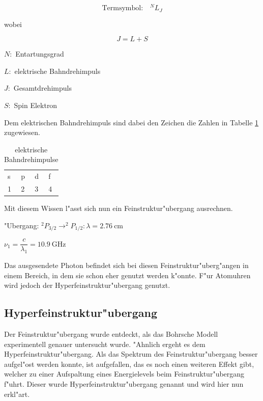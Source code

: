 \begin{refsection}
\begin{equation}
	\text{Termsymbol:} \quad ^NL _J
\end{equation}

wobei

\begin{equation}
	J = L + S
\end{equation}

$N:$ Entartungsgrad

$L:$ elektrische Bahndrehimpuls

$J:$ Gesamtdrehimpuls

$S:$ Spin Elektron

Dem elektrischen Bahndrehimpuls sind dabei den Zeichen die Zahlen in
Tabelle \ref{atomuhr:drehimpulsnotation} zugewiesen.

\begin{table}
	\centering	
	\begin{tabular}{llll}
		s & p & d & f \\
		1 & 2 & 3 & 4 \\
	\end{tabular}
	\caption{elektrische Bahndrehimpulse}
	\label{atomuhr:drehimpulsnotation}
\end{table}

Mit diesem Wissen l"asst sich nun ein Feinstruktur"ubergang ausrechnen. 
\begin{center}
		"Ubergang: $^2P_{3/2} \rightarrow ^2P_{1/2}: \lambda = \SI{2.76}{\centi\meter}$
		
		$\nu_1 = \dfrac{c}{\lambda_1} = \SI{10.9}{\giga\hertz}$
\end{center}

Das ausgesendete Photon befindet sich bei diesen
Feinstruktur"uberg"angen in einem Bereich, in dem sie schon eher
genutzt werden k"onnte. F"ur Atomuhren wird jedoch der
Hyperfeinstruktur"ubergang genutzt.

\subsection{Hyperfeinstruktur"ubergang}
\label{sec:hyperf}
Der Feinstruktur"ubergang wurde entdeckt, als das Bohrsche Modell
experimentell genauer untersucht wurde. "Ahnlich ergeht es dem
Hyperfeinstruktur"ubergang. Als das Spektrum des Feinstruktur"ubergang
besser aufgel"ost werden konnte, ist aufgefallen, das es noch einen
weiteren Effekt gibt, welcher zu einer Aufspaltung eines Energielevels
beim Feinstruktur"ubergang f"uhrt. Dieser wurde
Hyperfeinstruktur"ubergang genannt und wird hier nun erkl"art.


\end{refsection}
